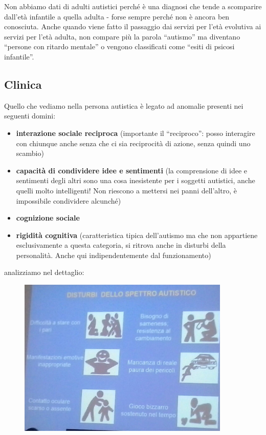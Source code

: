 Non abbiamo dati di adulti autistici perché è una diagnosi che tende a
scomparire dall'età infantile a quella adulta - forse sempre perché non
è ancora ben conosciuta. Anche quando viene fatto il passaggio dai
servizi per l'età evolutiva ai servizi per l'età adulta, non compare più
la parola ``autismo'' ma diventano ``persone con ritardo mentale'' o
vengono classificati come ``esiti di psicosi infantile''.

\subsection{Clinica}

Quello che vediamo nella persona autistica è legato ad anomalie presenti
nei seguenti domini:

\begin{itemize}
\item
  \textbf{interazione sociale reciproca} (importante il ``reciproco'':
  posso interagire con chiunque anche senza che ci sia reciprocità di
  azione, senza quindi uno scambio)
\item
  \textbf{capacità di condividere idee e sentimenti} (la comprensione di
  idee e sentimenti degli altri sono una cosa inesistente per i soggetti
  autistici, anche quelli molto intelligenti! Non riescono a mettersi
  nei panni dell'altro, è impossibile condividere alcunché)
\item
  \textbf{cognizione sociale}
\item
  \textbf{rigidità cognitiva} (caratteristica tipica dell'autismo ma che
  non appartiene esclusivamente a questa categoria, si ritrova anche in
  disturbi della personalità. Anche qui indipendentemente dal
  funzionamento)
\end{itemize}

analizziamo nel dettaglio:

\begin{figure}[!ht]
\centering
	\includegraphics[width=0.9\textwidth]{014/image1.png}
\end{figure}

